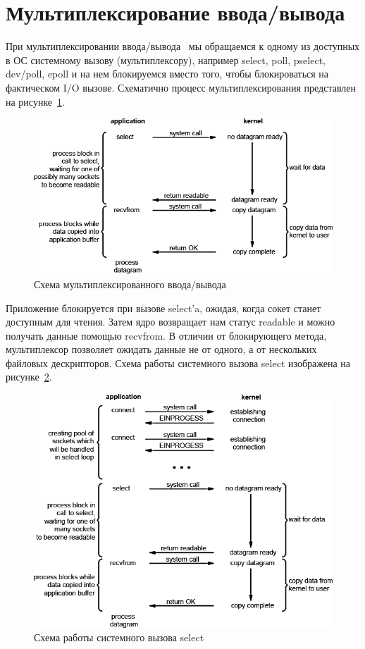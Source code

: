 \section{Мультиплексирование ввода/вывода}

При мультиплексировании ввода/вывода~\cite{multiplex} мы обращаемся к одному из доступных в ОС системному вызову (мультиплексору), например select, poll, pselect, dev/poll, epoll и на нем блокируемся вместо того, чтобы блокироваться на фактическом I/O вызове. Схематично процесс мультиплексирования представлен на рисунке~\ref{fig:multiplex}.

\captionsetup{justification=centering,singlelinecheck=false}
\begin{figure}[H]
	\centering
	\includegraphics[width=1\linewidth]{csv/multiplex}
	\caption{Схема мультиплексированного ввода/вывода}
	\label{fig:multiplex}
\end{figure}

Приложение блокируется при вызове select'a, ожидая, когда сокет станет доступным для чтения. Затем ядро возвращает нам статус readable и можно получать данные помощью recvfrom. В отличии от блокирующего метода, мультиплексор позволяет ожидать данные не от одного, а от нескольких файловых дескрипторов. Схема работы системного вызова select изображена на рисунке~\ref{fig:select}.

\begin{figure}[H]
	\centering
	\includegraphics[width=1\linewidth]{csv/select}
	\caption{Схема работы системного вызова select}
	\label{fig:select}
\end{figure}

